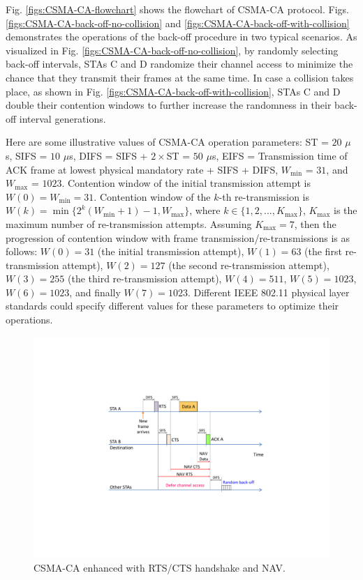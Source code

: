 Fig. \ref{figs:CSMA-CA-flowchart} shows the flowchart of CSMA-CA protocol. Figs. \ref{figs:CSMA-CA-back-off-no-collision} and \ref{figs:CSMA-CA-back-off-with-collision} demonstrates the operations of the back-off procedure in two typical scenarios. As visualized in Fig. \ref{figs:CSMA-CA-back-off-no-collision}, by randomly selecting back-off intervals, STAs C and D randomize their channel access to minimize the chance that they transmit their frames at the same time. In case a collision takes place, as shown in Fig. \ref{figs:CSMA-CA-back-off-with-collision}, STAs C and D double their contention windows to further increase the randomness in their back-off interval generations.

Here are some illustrative values of CSMA-CA operation parameters: ST = $20$ $\mu$s, SIFS = $10$ $\mu$s, DIFS = SIFS + $2\times$ST = $50$ $\mu$s, EIFS = Transmission time of ACK frame at lowest physical mandatory rate + SIFS + DIFS, $W_{\min}$ = $31$, and $W_{\max}$ = $1023$. Contention window of the initial transmission attempt is $W(0)=W_{\min}=31$. Contention window of the $k$-th re-transmission is $W(k)=\min\{2^{k}(W_{\min}+1)-1, W_{\max}\}$, where $k \in \{1,2, ..., K_{\max}\}$, $K_{\max}$ is the maximum number of re-transmission attempts. Assuming $K_{\max}=7$, then the progression of contention window with frame transmission/re-transmissions is as follows: $W(0)=31$ (the initial transmission attempt), $W(1)=63$ (the first re-transmission attempt), $W(2)=127$ (the second re-transmission attempt), $W(3)=255$ (the third re-transmission attempt), $W(4)=511$, $W(5)=1023$, $W(6)=1023$, and finally $W(7)=1023$. Different IEEE 802.11 physical layer standards could specify different values for these parameters to optimize their operations.

\begin{figure}[!t]
	\centering
	\includegraphics[width=0.65\columnwidth]{figures2/802-11-RTS-CTS-NAV}
	\caption{CSMA-CA enhanced with RTS/CTS handshake and NAV.}
	\label{figs:802-11-RTS-CTS-NAV}
\end{figure}

